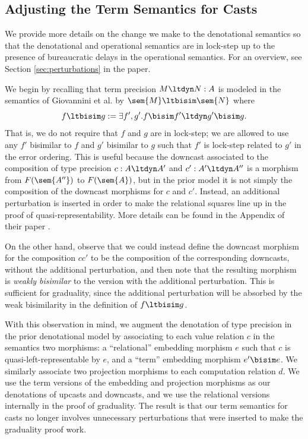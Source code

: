\subsection{Adjusting the Term Semantics for Casts}
We provide more details on the change we make to the denotational semantics so
that the denotational and operational semantics are in lock-step up to the
presence of bureaucratic delays in the operational semantics. For an overview,
see Section \ref{sec:perturbations} in the paper.

We begin by recalling that term precision $M \ltdyn N : A$ is modeled in the
semantics of Giovannini et al. by $\sem{M} \ltbisim \sem{N}$ where
%
\[ f \ltbisim g := \exists f', g'. f \bisim f' \ltdyn g' \bisim g. \]
%
That is, we do not require that $f$ and $g$ are in lock-step; we are allowed to
use any $f'$ bisimilar to $f$ and $g'$ bisimilar to $g$ such that $f'$ is
lock-step related to $g'$ in the error ordering.
%
This is useful because the downcast associated to the composition of type
precision $c : A \ltdyn A'$ and $c' : A' \ltdyn A''$ is a morphism from
$F(\sem{A''})$ to $F(\sem{A})$, but in the prior model it is not simply the
composition of the downcast morphisms for $c$ and $c'$. Instead, an additional
perturbation is inserted in order to make the relational squares line up in the
proof of quasi-representability. More details can be found in the Appendix of
their paper \cite{gtt-sgdt-extended-version}.

On the other hand, observe that we could instead define the downcast morphism
for the composition $cc'$ to be the composition of the corresponding downcasts,
without the additional perturbation, and then note that the resulting morphism
is \emph{weakly bisimilar} to the version with the additional perturbation. This
is sufficient for graduality, since the additional perturbation will be absorbed
by the weak bisimilarity in the definition of $f \ltbisim g$.


With this observation in mind, we augment the denotation of type precision in
the prior denotational model by associating to each value relation $c$ in the
semantics two morphisms: a ``relational'' embedding morphism $e$ such that $c$
is quasi-left-representable by $e$, and a ``term'' embedding morphism $e' \bisim
e$. We similarly associate two projection morphisms to each computation relation
$d$. We use the term versions of the embedding and projection morphisms as our
denotations of upcasts and downcasts, and we use the relational versions
internally in the proof of graduality.
%
The result is that our term semantics for casts no longer involves unnecessary
perturbations that were inserted to make the graduality proof work.




